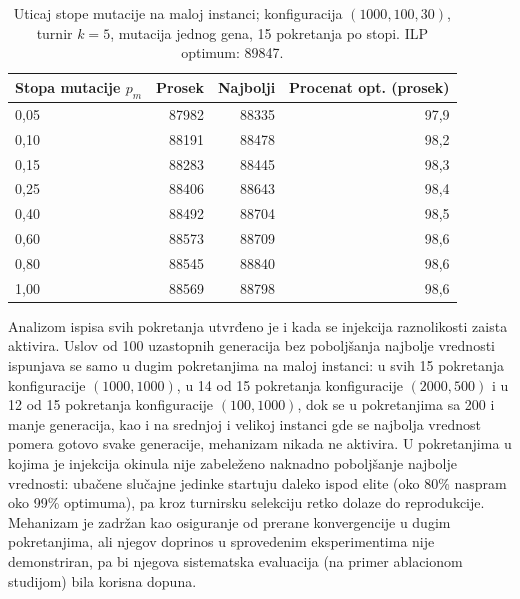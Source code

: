 \documentclass[12pt]{article}
\begin{document}
\begin{table}[H]
\centering
\begin{tabular}{|l|r|r|r|}
\hline
Stopa mutacije $p_m$ & Prosek & Najbolji & Procenat opt. (prosek) \\ \hline
0,05 & 87982 & 88335 & 97,9 \\ \hline
0,10 & 88191 & 88478 & 98,2 \\ \hline
0,15 & 88283 & 88445 & 98,3 \\ \hline
0,25 & 88406 & 88643 & 98,4 \\ \hline
0,40 & 88492 & 88704 & 98,5 \\ \hline
0,60 & 88573 & 88709 & 98,6 \\ \hline
0,80 & 88545 & 88840 & 98,6 \\ \hline
1,00 & 88569 & 88798 & 98,6 \\ \hline
\end{tabular}
\caption{Uticaj stope mutacije na maloj instanci; konfiguracija $(1000, 100, 30)$, turnir $k = 5$, mutacija jednog gena, 15 pokretanja po stopi. ILP optimum: 89847.}
\label{tab:mutacija}
\end{table}

Analizom ispisa svih pokretanja utvrđeno je i kada se injekcija raznolikosti zaista aktivira. Uslov od 100 uzastopnih generacija bez poboljšanja najbolje vrednosti ispunjava se samo u dugim pokretanjima na maloj instanci: u svih 15 pokretanja konfiguracije $(1000, 1000)$, u 14 od 15 pokretanja konfiguracije $(2000, 500)$ i u 12 od 15 pokretanja konfiguracije $(100, 1000)$, dok se u pokretanjima sa 200 i manje generacija, kao i na srednjoj i velikoj instanci gde se najbolja vrednost pomera gotovo svake generacije, mehanizam nikada ne aktivira. U pokretanjima u kojima je injekcija okinula nije zabeleženo naknadno poboljšanje najbolje vrednosti: ubačene slučajne jedinke startuju daleko ispod elite (oko 80\% naspram oko 99\% optimuma), pa kroz turnirsku selekciju retko dolaze do reprodukcije. Mehanizam je zadržan kao osiguranje od prerane konvergencije u dugim pokretanjima, ali njegov doprinos u sprovedenim eksperimentima nije demonstriran, pa bi njegova sistematska evaluacija (na primer ablacionom studijom) bila korisna dopuna.
\end{document}
